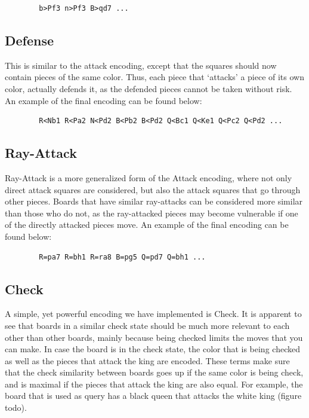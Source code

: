 \documentclass[11pt]{article}
\begin{document}
    \begin{BVerbatim}
        b>Pf3 n>Pf3 B>qd7 ...
    \end{BVerbatim}

    \subsection{Defense}

    This is similar to the attack encoding, except that the squares should now contain pieces of the same color. Thus, each piece that `attacks' a piece of its own color, actually defends it, as the defended pieces cannot be taken without risk. An example of the final encoding can be found below:

    \begin{BVerbatim}
        R<Nb1 R<Pa2 N<Pd2 B<Pb2 B<Pd2 Q<Bc1 Q<Ke1 Q<Pc2 Q<Pd2 ...
    \end{BVerbatim}

    \subsection{Ray-Attack}

    Ray-Attack is a more generalized form of the Attack encoding, where not only direct attack squares are considered, but also the attack squares that go through other pieces. Boards that have similar ray-attacks can be considered more similar than those who do not, as the ray-attacked pieces may become vulnerable if one of the directly attacked pieces move. An example of the final encoding can be found below:

    \begin{BVerbatim}
        R=pa7 R=bh1 R=ra8 B=pg5 Q=pd7 Q=bh1 ...
    \end{BVerbatim}

    \subsection{Check}

    A simple, yet powerful encoding we have implemented is Check. It is apparent to see that boards in a similar check state should be much more relevant to each other than other boards, mainly because being checked limits the moves that you can make. In case the board is in the check state, the color that is being checked as well as the pieces that attack the king are encoded. These terms make sure that the check similarity between boards goes up if the same color is being check, and is maximal if the pieces that attack the king are also equal. For example, the board that is used as query has a black queen that attacks the white king (figure todo).
\end{document}
